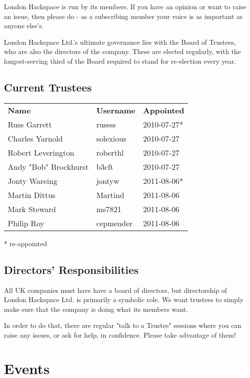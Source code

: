 \documentclass[12pt,a4paper]{book}
\begin{document}
London Hackspace is run by its members. If you have an opinion or want to raise an issue, then please do - as a subscribing member your voice is as important as anyone else's.

London Hackspace Ltd.'s ultimate governance lies with the Board of Trustees, who are also the directors of the company. These are elected regularly, with the longest-serving third of the Board required to stand for re-election every year.

\subsection{Current Trustees}

\begin{tabular}{lll}
	\textbf{Name}         & \textbf{Username} & \textbf{Appointed} \\
	Russ Garrett          & russss    & 2010-07-27* \\
	Charles Yarnold       & solexious & 2010-07-27 \\
	Robert Leverington    & roberthl  & 2010-07-27 \\
	Andy "Bob" Brockhurst & b3cft     & 2010-07-27 \\
	Jonty Wareing         & jontyw    & 2011-08-06* \\
	Martin Dittus         & Martind   & 2011-08-06 \\
	Mark Steward          & ms7821    & 2011-08-06 \\
	Philip Roy            & cepmender & 2011-08-06 \\
\end{tabular}

* re-appointed

\subsection{Directors' Responsibilities}

All UK companies must have have a board of directors, but directorship of London Hackspace Ltd. is primarily a symbolic role. We want trustees to simply make sure that the company is doing what its members want.

In order to do that, there are regular "talk to a Trustee" sessions where you can raise any issues, or ask for help, in confidence. Please take advantage of them!


\section{Events}
\end{document}
